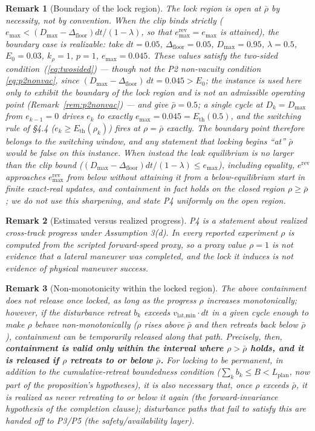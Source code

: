 \documentclass[11pt]{article}
\newtheorem{remark}{Remark}
\newcommand{\Dfloor}{\Delta_{\text{floor}}}
\newcommand{\Erev}{e^{\text{rev}}}
\newcommand{\Eremax}{e^{\text{rev}}_{\max}}
\newcommand{\Eth}{E_{\text{th}}}
\begin{document}
\begin{remark}[Boundary of the lock region] \label{rem:lockboundary}
The lock region is open at $\bar\rho$ by necessity, not by convention. When the clip binds strictly ($e_{\max} < (D_{\max}-\Dfloor)dt/(1-\lambda)$, so that $\Eremax = e_{\max}$ is \emph{attained}), the boundary case is realizable: take $dt = 0.05$, $\Dfloor = 0.05$, $D_{\max} = 0.95$, $\lambda = 0.5$, $E_0 = 0.03$, $k_\rho = 1$, $p = 1$, $e_{\max} = 0.045$. These values satisfy the two-sided condition~(\ref{eq:twosided}) --- though not the P2 non-vacuity condition \eqref{eq:p2nonvac}, since $(D_{\max}-\Dfloor)\,dt = 0.045 > E_0$; the instance is used here only to exhibit the boundary of the lock region and is not an admissible operating point (Remark~\ref{rem:p2nonvac}) --- and give $\bar\rho = 0.5$; a single cycle at $D_k = D_{\max}$ from $e_{k-1} = 0$ drives $e_k$ to exactly $e_{\max} = 0.045 = \Eth(0.5)$, and the switching rule of \S4.4 ($e_k \ge \Eth(\rho_k)$) fires at $\rho = \bar\rho$ exactly. The boundary point therefore belongs to the switching window, and any statement that locking begins ``at'' $\bar\rho$ would be false on this instance. When instead the leak equilibrium is no larger than the clip bound ($(D_{\max}-\Dfloor)dt/(1-\lambda) \le e_{\max}$), including equality, $\Erev$ approaches $\Eremax$ from below without attaining it from a below-equilibrium start in finite exact-real updates, and containment in fact holds on the closed region $\rho \ge \bar\rho$; we do not use this sharpening, and state P4 uniformly on the open region.
\end{remark}

\begin{remark}[Estimated versus realized progress]
P4 is a statement about realized cross-track progress under Assumption 3(d). In every reported experiment $\rho$ is computed from the scripted forward-speed proxy, so a proxy value $\rho=1$ is not evidence that a lateral maneuver was completed, and the lock it induces is not evidence of physical maneuver success.
\end{remark}

\begin{remark}[Non-monotonicity within the locked region] \label{rem:nonmono}
The above containment does not release once locked, as long as the progress $\rho$ increases monotonically; however, if the disturbance retreat $b_k$ exceeds $v_{\text{lat,min}} \cdot dt$ in a given cycle enough to make $\rho$ behave non-monotonically ($\rho$ rises above $\bar\rho$ and then retreats back below $\bar\rho$), containment can be temporarily released along that path. Precisely, then, \textbf{containment is valid only within the interval where $\rho > \bar\rho$ holds, and it is released if $\rho$ retreats to or below $\bar\rho$.} For locking to be permanent, in addition to the cumulative-retreat boundedness condition ($\sum_k b_k \le B < L_{\text{plan}}$, now part of the proposition's hypotheses), it is also necessary that, once $\rho$ exceeds $\bar\rho$, it is realized as never retreating to or below it again (the forward-invariance hypothesis of the completion clause); disturbance paths that fail to satisfy this are handed off to P3/P5 (the safety/availability layer).
\end{remark}
\end{document}

